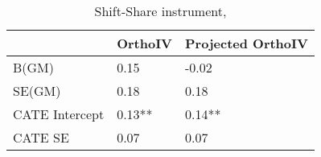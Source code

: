 \begin{table}\centering\caption{Shift-Share instrument, }\begin{tabular}{lll}
\toprule
                & OrthoIV   & Projected OrthoIV   \\
\midrule
 B(GM)          & 0.15      & -0.02               \\
 SE(GM)         & 0.18      & 0.18                \\
 CATE Intercept & 0.13**    & 0.14**              \\
 CATE SE        & 0.07      & 0.07                \\
\bottomrule
\end{tabular}\end{table}